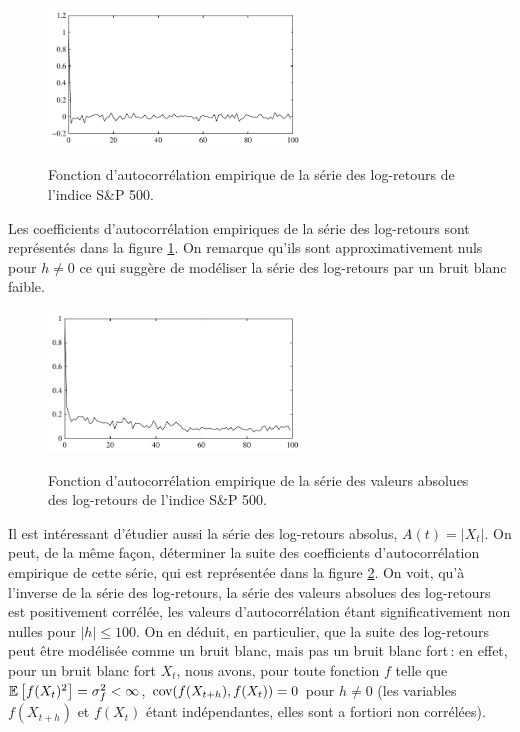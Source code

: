 \begin{figure}
  \centering
  \includegraphics[width=0.6\textwidth]{Figures/corrsplogretour}\\
  \caption{Fonction d'autocorr\'elation empirique de la s\'erie des log-retours
 de l'indice S\&P 500.}\label{fig:sp-xcorr}
\end{figure}
  Les coefficients d'autocorr\'elation
empiriques de la s\'erie des log-retours sont repr\'esent\'es dans la figure
\ref{fig:sp-xcorr}. On remarque qu'ils sont approximativement nuls
pour $h \ne 0$ ce qui sugg\`ere de mod\'eliser la s\'erie des
log-retours par un bruit blanc faible.
\begin{figure}
  \centering
  \includegraphics[width=0.6\textwidth]{Figures/corrabssplogretour}\\
  \caption{Fonction d'autocorr\'elation empirique de la s\'erie des valeurs absolues des
 log-retours de l'indice S\&P 500.}\label{fig:sp-abs-xcorr}
\end{figure}
Il est int\'eressant d'\'etudier aussi la s\'erie des log-retours
absolus, $A(t) = |X_{t}|$. On peut, de la m\^{e}me fa\c{c}on,
d\'eterminer la suite des coefficients d'autocorr\'elation empirique
de cette s\'erie, qui est repr\'esent\'ee dans la figure
\ref{fig:sp-abs-xcorr}. On voit, qu'\`a l'inverse de la s\'erie des
log-retours, la s\'erie des valeurs absolues des log-retours est
positivement corr\'el\'ee, les valeurs d'autocorr\'elation \'etant
significativement non nulles pour $|h| \leq 100$. On en d\'eduit, en
particulier, que la suite des log-retours peut \^{e}tre mod\'elis\'ee
comme un bruit blanc, mais pas un bruit blanc fort\,: en effet,
pour un bruit blanc fort $X_{t}$, nous avons, pour toute fonction
$f$ telle que ${\mathbb E}\left[ f(X_{t})^2 \right] = \sigma_f^2 < \infty$,
$\mathrm{cov}(f(X_{t+h}),f(X_{t}))= 0$ pour $h\neq 0$ (les variables
$f(X_{t+h})$ et $f(X_{t})$ \'etant ind\'ependantes, elles sont a
fortiori non corr\'el\'ees).
